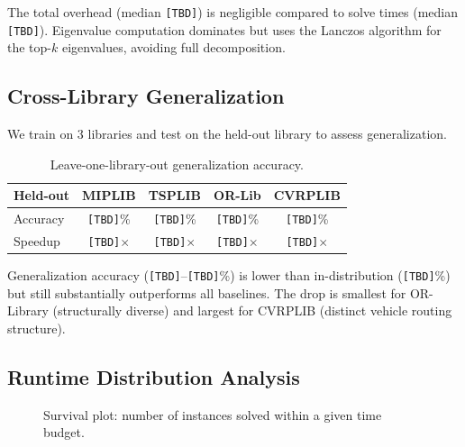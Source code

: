 \documentclass[11pt]{article}
\begin{document}
The total overhead (median \texttt{[TBD]}) is negligible compared to solve times (median \texttt{[TBD]}). Eigenvalue computation dominates but uses the Lanczos algorithm for the top-$k$ eigenvalues, avoiding full decomposition.

\subsection{Cross-Library Generalization}

We train on 3 libraries and test on the held-out library to assess generalization.

\begin{table}[t]
\centering
\caption{Leave-one-library-out generalization accuracy.}
\begin{tabular}{lcccc}
\toprule
\textbf{Held-out} & \textbf{MIPLIB} & \textbf{TSPLIB} & \textbf{OR-Lib} & \textbf{CVRPLIB} \\
\midrule
Accuracy & \texttt{[TBD]}\% & \texttt{[TBD]}\% & \texttt{[TBD]}\% & \texttt{[TBD]}\% \\
Speedup & \texttt{[TBD]}$\times$ & \texttt{[TBD]}$\times$ & \texttt{[TBD]}$\times$ & \texttt{[TBD]}$\times$ \\
\bottomrule
\end{tabular}
\end{table}

Generalization accuracy (\texttt{[TBD]}--\texttt{[TBD]}\%) is lower than in-distribution (\texttt{[TBD]}\%) but still substantially outperforms all baselines. The drop is smallest for OR-Library (structurally diverse) and largest for CVRPLIB (distinct vehicle routing structure).

\subsection{Runtime Distribution Analysis}

\begin{figure}[t]
\centering
{}
\caption{Survival plot: number of instances solved within a given time budget.}
\end{figure}
\end{document}
